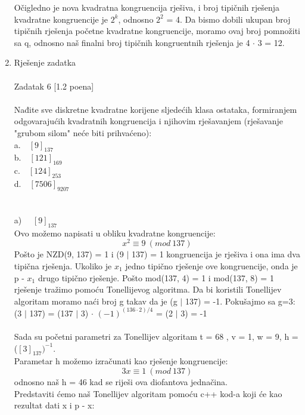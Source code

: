 \documentclass[12pt]{article}
\begin{document}
\begin{enumerate}
		Očigledno je nova kvadratna kongruencija rješiva, i broj tipičnih rješenja kvadratne kongruencije je $2^k$, odnosno $2^2$ = 4.
		Da bismo dobili ukupan broj tipičnih rješenja početne kvadratne kongruencije, moramo ovaj broj pomnožiti sa q, odnosno naš finalni broj tipičnih kongruentnih rješenja je 4 ${\cdot}$ 3 = 12.
		\newpage
		\item Rješenje zadatka \\
		\\
		Zadatak 6 [1.2 poena] \\
		\\
		Nađite sve diskretne kvadratne korijene sljedećih klasa ostataka, formiranjem odgovarajućih
        kvadratnih kongruencija i njihovim rješavanjem (rješavanje "grubom silom" neće biti
        prihvaćeno): \\
        a.~~$[9]_{137}$ \\
        b.~~$[121]_{169}$ \\
        c.~~$[124]_{253}$ \\
        d.~~$[7506]_{9207}$ \\
		\\
		\\
		a) ~~$[9]_{137}$ \\ 
		Ovo možemo napisati u obliku kvadratne kongruencije: 
		\begin{equation*}
		x^2 \equiv 9~(mod~137)
		\end{equation*}
		Pošto je NZD(9, 137) = 1 i (9 ${\mid}$ 137) = 1 kongruencija je rješiva i ona
ima dva tipična rješenja. Ukoliko je $x_1$ jedno tipično rješenje ove kongruencije, 
onda je p - $x_1$ drugo tipično rješenje. Pošto mod(137, 4) = 1
i mod(137, 8) = 1 rješenje tražimo pomoću Tonellijevog algoritma.
Da bi koristili Tonellijev algoritam moramo naći broj g takav da je
(g ${\mid}$ 137) = -1. Pokušajmo sa g=3: (3 ${\mid}$ 137) = (137 ${\mid}$ 3) ${\cdot}$ $(-1)^{(136 \cdot 2) / 4}$
= (2 ${\mid}$ 3) = -1 \\
\\
Sada su početni parametri za Tonellijev algoritam t = 68 , v = 1, w = 9,
h = ($[3]_{137})^{-1}$. \\
Parametar h možemo izračunati kao rješenje kongruencije:
\begin{equation*}
3x \equiv 1~(mod~137)
\end{equation*}
odnosno naš h = 46 kad se riješi ova diofantova jednačina. \\ 
Predstaviti ćemo naš Tonellijev algoritam pomoću c++ kod-a koji će kao rezultat dati x i p - x: \\

\end{enumerate}
\end{document}
